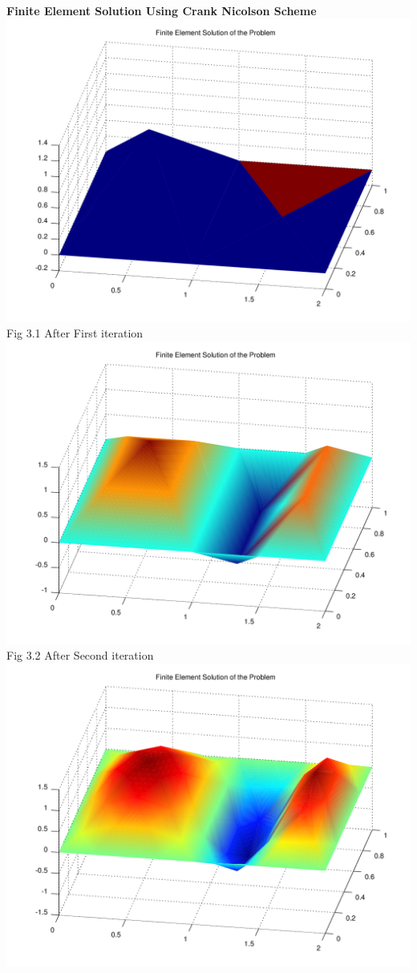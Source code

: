 \documentclass{report}
\numberwithin{equation}{chapter}
\begin{document}
\newpage
\begin{center}
\textbf{Finite Element Solution Using Crank Nicolson  Scheme}\\
\includegraphics[scale=0.58]{11}\hspace*{70cm}
{Fig 3.1 After First iteration}
\includegraphics[scale=0.58]{22}\hspace*{70cm}
{Fig 3.2 After Second iteration}
\includegraphics[scale=0.58]{33}\hspace*{70cm}

\end{center}
\end{document}
